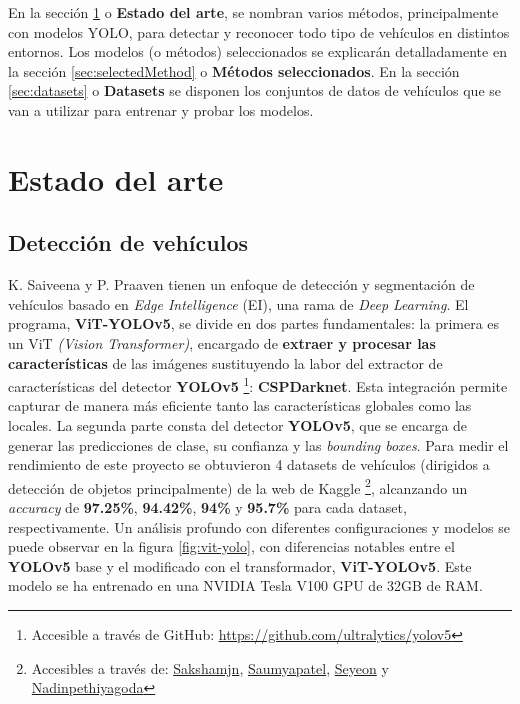\documentclass[11pt]{article}
\begin{document}
En la sección \ref{sec:literatureReview} o \textbf{Estado del arte}, se nombran varios métodos, principalmente con modelos YOLO, para detectar y reconocer todo tipo de vehículos en distintos entornos. Los modelos (o métodos) seleccionados se explicarán detalladamente en la sección \ref{sec:selectedMethod} o \textbf{Métodos seleccionados}. En la sección \ref{sec:datasets} o \textbf{Datasets} se disponen los conjuntos de datos de vehículos que se van a utilizar para entrenar y probar los modelos. 





\section{Estado del arte}
\label{sec:literatureReview}

\subsection{Detección de vehículos}

K. Saiveena y P. Praaven\cite{SAIVEENA2026111086} tienen un enfoque de detección y segmentación de vehículos basado en \textit{Edge Intelligence} (EI), una rama de \textit{Deep Learning}. El programa, \textbf{ViT-YOLOv5}, se divide en dos partes fundamentales: la primera es un ViT \textit{(Vision Transformer)}, encargado de \textbf{extraer y procesar las características} de las imágenes sustituyendo la labor del extractor de características del detector \textbf{YOLOv5} \footnote{Accesible a través de GitHub: \url{https://github.com/ultralytics/yolov5}}: \textbf{CSPDarknet}. Esta integración permite capturar de manera más eficiente tanto las características globales como las locales. La segunda parte consta del detector \textbf{YOLOv5}, que se encarga de generar las predicciones de clase, su confianza y las \textit{bounding boxes}. Para medir el rendimiento de este proyecto se obtuvieron 4 datasets de vehículos (dirigidos a detección de objetos principalmente) de la web de Kaggle \footnote{Accesibles a través de: \href{https://www.kaggle.com/datasets/sakshamjn/vehicle-detection-8-classes-object-detection}{Sakshamjn}, \href{https://www.kaggle.com/datasets/saumyapatel/traffic-vehicles-object-detection}{Saumyapatel}, \href{https://www.kaggle.com/datasets/seyeon040768/car-detection-dataset}{Seyeon} y \href{https://www.kaggle.com/datasets/nadinpethiyagoda/vehicle-dataset-for-yolo}{Nadinpethiyagoda}}, alcanzando un \textit{accuracy} de \textbf{97.25\%}, \textbf{94.42\%}, \textbf{94\%} y \textbf{95.7\%} para cada dataset, respectivamente. Un análisis profundo con diferentes configuraciones y modelos se puede observar en la figura \ref{fig:vit-yolo}, con diferencias notables entre el \textbf{YOLOv5} base y el modificado con el transformador, \textbf{ViT-YOLOv5}. Este modelo se ha entrenado en una NVIDIA Tesla V100 GPU de 32GB de RAM.
\end{document}
